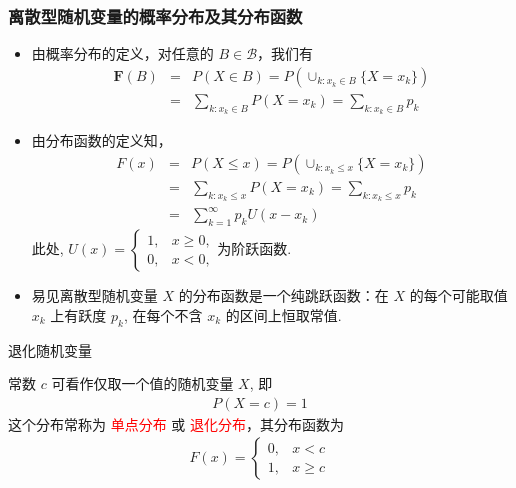 \documentclass[Prob-All.tex]{subfiles}
\begin{document}
\begin{frame}
	\frametitle{离散型随机变量的概率分布及其分布函数}
	\begin{itemize}[<+-|alert@+>]
		\item 由概率分布的定义，对任意的 $B\in \mathcal{B}$，我们有
		    {\small \begin{eqnarray*}
			      \mathbf{F}(B)&=&P(X\in B)=P(\cup_{k:x_k\in B}\{X=x_k\})\\
			      &=&\sum_{k:x_k\in B}P(X=x_k)=\sum_{k:x_k\in B}p_k
		      \end{eqnarray*}}
		\item 由分布函数的定义知，
		      {\small \begin{eqnarray*}
			      F(x)&=&P(X\le x)=P(\cup_{k:x_k\le x}\{X=x_k\})\\
			      &=&\sum_{k:x_k\le x}P(X=x_k)=\sum_{k:x_k\le x}p_k\\
				  &=&\sum_{k=1}^\infty p_kU(x-x_k)
		      \end{eqnarray*}}
			  此处, $U(x)=\left\{\begin{array}{ll}
				1, & x\geq 0,\\
				0, & x<0,
				\end{array}\right.
			  $为阶跃函数.
		\item 易见离散型随机变量 $X$ 的分布函数是一个纯跳跃函数：在 $X$ 的每个可能取值 $x_k$ 上有跃度 $p_k$, 在每个不含 $x_k$ 的区间上恒取常值.
	\end{itemize}

\end{frame}
\begin{frame}{退化随机变量}
	\begin{exam}
		常数 $c$ 可看作仅取一个值的随机变量 $X$, 即
		\begin{eqnarray*}
			P(X=c)=1
		\end{eqnarray*}
		这个分布常称为 \textcolor{red}{单点分布} 或 \textcolor{red}{退化分布}，其分布函数为
		\pause \begin{eqnarray*}
			F(x)=\left\{
			\begin{array}{ll}
				0, & x<c     \\
				1, & x\ge c
			\end{array}
			\right.
		\end{eqnarray*}
	\end{exam}

\end{frame}
\end{document}
